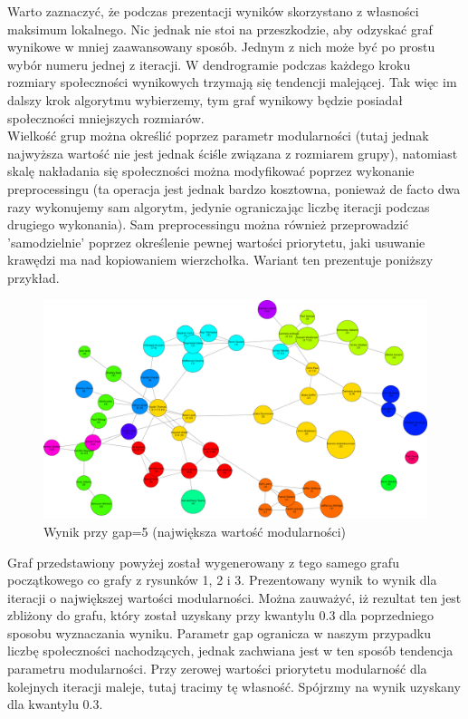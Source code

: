 \documentclass{article}
\begin{document}
Warto zaznaczyć, że podczas prezentacji wyników skorzystano z własności maksimum lokalnego. Nic jednak nie stoi na przeszkodzie, aby odzyskać graf wynikowe w mniej zaawansowany sposób. Jednym z nich może być po prostu wybór numeru jednej z iteracji. W dendrogramie podczas każdego kroku rozmiary społeczności wynikowych trzymają się tendencji malejącej. Tak więc im dalszy krok algorytmu wybierzemy, tym graf wynikowy będzie posiadał społeczności mniejszych rozmiarów. \\

Wielkość grup można określić poprzez parametr modularności (tutaj jednak najwyższa wartość nie jest jednak ściśle związana z rozmiarem grupy), natomiast skalę nakładania się społeczności można modyfikować poprzez wykonanie preprocessingu (ta operacja jest jednak bardzo kosztowna, ponieważ de facto dwa razy wykonujemy sam algorytm, jedynie ograniczając liczbę iteracji podczas drugiego wykonania). Sam preprocessingu można również przeprowadzić 'samodzielnie' poprzez określenie pewnej wartości priorytetu, jaki usuwanie krawędzi ma nad kopiowaniem wierzchołka. Wariant ten prezentuje poniższy przykład.\\

\begin{figure}[H]
\centering
\includegraphics[width=\textwidth]{images/is-sample-4.png}
\caption{Wynik przy gap=5 (największa wartość modularności)}
\end{figure}

Graf przedstawiony powyżej został wygenerowany z tego samego grafu początkowego co grafy z rysunków 1, 2 i 3. Prezentowany wynik to wynik dla iteracji o największej wartości modularności. Można zauważyć, iż rezultat ten jest zbliżony do grafu, który został uzyskany przy kwantylu 0.3 dla poprzedniego sposobu wyznaczania wyniku. Parametr gap ogranicza w naszym przypadku liczbę społeczności nachodzących, jednak zachwiana jest w ten sposób tendencja parametru modularności. Przy zerowej wartości priorytetu modularność dla kolejnych iteracji maleje, tutaj tracimy tę własność. Spójrzmy na wynik uzyskany dla kwantylu 0.3.
\end{document}
